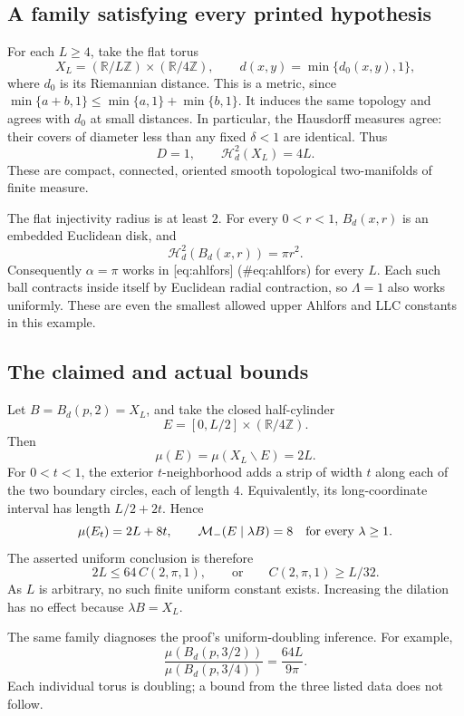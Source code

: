 \documentclass[10pt]{article}
\begin{document}
\subsection*{A family satisfying every printed hypothesis}
For each \(L\ge4\), take the flat torus \[X_L=(\mathbb R/L\mathbb Z)\times(\mathbb R/4\mathbb Z),\qquad
 d(x,y)=\min\{d_0(x,y),1\},\] where \(d_0\) is its Riemannian distance. This is a metric, since \(\min\{a+b,1\}\le\min\{a,1\}+\min\{b,1\}\). It induces the same topology and agrees with \(d_0\) at small distances. In particular, the Hausdorff measures agree: their covers of diameter less than any fixed \(\delta<1\) are identical. Thus \[D=1,\qquad \mathcal H^2_d(X_L)=4L.\] These are compact, connected, oriented smooth topological two-manifolds of finite measure.\par
The flat injectivity radius is at least \(2\). For every \(0<r<1\), \(B_d(x,r)\) is an embedded Euclidean disk, and \[\mathcal H^2_d(B_d(x,r))=\pi r^2.\] Consequently \(\alpha=\pi\) works in [eq:ahlfors] (\#eq:ahlfors) for every \(L\). Each such ball contracts inside itself by Euclidean radial contraction, so \(\Lambda=1\) also works uniformly. These are even the smallest allowed upper Ahlfors and LLC constants in this example.\par
\subsection*{The claimed and actual bounds}
Let \(B=B_d(p,2)=X_L\), and take the closed half-cylinder \[E=[0,L/2]\times(\mathbb R/4\mathbb Z).\] Then \[\mu(E)=\mu(X_L\smallsetminus E)=2L.\] For \(0<t<1\), the exterior \(t\)-neighborhood adds a strip of width \(t\) along each of the two boundary circles, each of length \(4\). Equivalently, its long-coordinate interval has length \(L/2+2t\). Hence \[\mu(E_t)=2L+8t,\qquad
 \mathcal M_-(E\mid\lambda B)=8\quad\hbox{for every }\lambda\ge1.\] The asserted uniform conclusion is therefore \[2L\le64\,C(2,\pi,1),\qquad\text{or}\qquad
 C(2,\pi,1)\ge L/32.\] As \(L\) is arbitrary, no such finite uniform constant exists. Increasing the dilation has no effect because \(\lambda B=X_L\).\par
The same family diagnoses the proof’s uniform-doubling inference. For example, \[\frac{\mu(B_d(p,3/2))}{\mu(B_d(p,3/4))}
       =\frac{64L}{9\pi}.\] Each individual torus is doubling; a bound from the three listed data does not follow.\par
\end{document}
